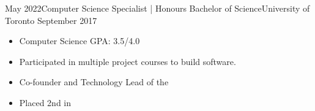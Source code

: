 %
%
%


\begin{experiences}
  \university
    {May 2022}{Computer Science Specialist | Honours Bachelor of Science}{University of Toronto}
    {September 2017} {
                      \begin{itemize}
                        \item Computer Science GPA: 3.5/4.0                   
                        \item Participated in multiple project courses to build software.          
                        \item Co-founder and Technology Lead of the            
                        \item Placed 2nd in                                                                 
                      \end{itemize}
                    }
\end{experiences}
